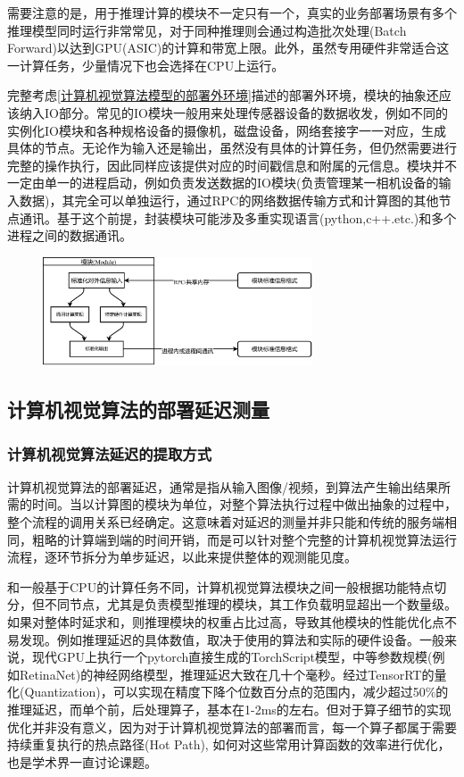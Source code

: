 \documentclass[master]{shtthesis}
\begin{document}
需要注意的是，用于推理计算的模块不一定只有一个，真实的业务部署场景有多个推理模型同时运行非常常见，对于同种推理则会通过构造批次处理(Batch Forward)\cite{mcclelland1987parallel}以达到GPU(ASIC)的计算和带宽上限。此外，虽然专用硬件非常适合这一计算任务，少量情况下也会选择在CPU上运行。

完整考虑\ref{计算机视觉算法模型的部署外环境}描述的部署外环境，模块的抽象还应该纳入IO部分。常见的IO模块一般用来处理传感器设备的数据收发，例如不同的实例化IO模块和各种规格设备的摄像机，磁盘设备，网络套接字一一对应，生成具体的节点。无论作为输入还是输出，虽然没有具体的计算任务，但仍然需要进行完整的操作执行，因此同样应该提供对应的时间戳信息和附属的元信息。模块并不一定由单一的进程启动，例如负责发送数据的IO模块(负责管理某一相机设备的输入数据)，其完全可以单独运行，通过RPC的网络数据传输方式和计算图的其他节点通讯。基于这个前提，封装模块可能涉及多重实现语言(python,c++.etc.)和多个进程之间的数据通讯。

\begin{figure}[htbp]
	\centering
	\includegraphics[width=8cm]{img/module.pdf}
	\label{模块的基本结构}
\end{figure}


\subsection{计算机视觉算法的部署延迟测量}\label{计算机视觉算法的部署延迟测量}
\subsubsection{计算机视觉算法延迟的提取方式}\label{计算机视觉算法延迟的提取方式}
计算机视觉算法的部署延迟，通常是指从输入图像/视频，到算法产生输出结果所需的时间。当以计算图的模块为单位，对整个算法执行过程中做出抽象的过程中，整个流程的调用关系已经确定。这意味着对延迟的测量并非只能和传统的服务端相同，粗略的计算端到端的时间开销，而是可以针对整个完整的计算机视觉算法运行流程，逐环节拆分为单步延迟，以此来提供整体的观测能见度。

和一般基于CPU的计算任务不同，计算机视觉算法模块之间一般根据功能特点切分，但不同节点，尤其是负责模型推理的模块，其工作负载明显超出一个数量级。如果对整体时延求和，则推理模块的权重占比过高，导致其他模块的性能优化点不易发现。例如推理延迟的具体数值，取决于使用的算法和实际的硬件设备。一般来说，现代GPU上执行一个pytorch直接生成的TorchScript模型，中等参数规模(例如RetinaNet\cite{lin2017focal})的神经网络模型，推理延迟大致在几十个毫秒。经过TensorRT的量化(Quantization)，可以实现在精度下降个位数百分点的范围内，减少超过50$\%$的推理延迟，而单个前，后处理算子，基本在1-2ms的左右。但对于算子细节的实现优化并非没有意义，因为对于计算机视觉算法的部署而言，每一个算子都属于需要持续重复执行的热点路径(Hot Path), 如何对这些常用计算函数的效率进行优化，也是学术界一直讨论课题\cite{cai2019maxpoolnms}。
\end{document}
